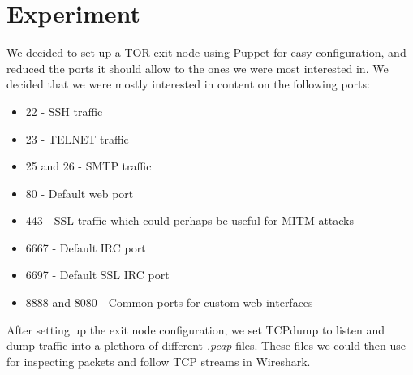 \section{Experiment}
We decided to set up a TOR exit node using Puppet for easy configuration, and reduced the ports it should allow to the ones we were most interested in. We decided that we were mostly interested in content on the following ports:\\

\begin{itemize}
	\item 22 - SSH traffic
	\item 23 - TELNET traffic
	\item 25 and 26 - SMTP traffic
	\item 80 - Default web port
	\item 443 - SSL traffic which could perhaps be useful for MITM attacks
	\item 6667 - Default IRC port
	\item 6697 - Default SSL IRC port
	\item 8888 and 8080 - Common ports for custom web interfaces
\end{itemize}

After setting up the exit node configuration, we set TCPdump to listen and dump traffic into a plethora of different \textit{.pcap} files. These files we could then use for inspecting packets and follow TCP streams in Wireshark.\\


